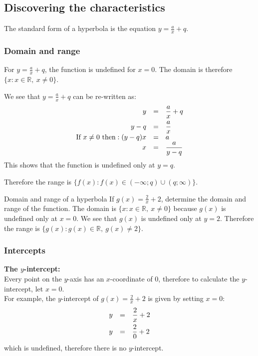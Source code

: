 \subsection*{Discovering the characteristics}  
The standard form of a hyperbola is the equation $y=\frac{a}{x}+q$.

\subsubsection*{Domain and range}

For $y=\frac{a}{x}+q$, the function is undefined for $x=0$. The domain is therefore $\{x:x\in \mathbb{R},~x\ne 0\}$.\par 
We see that $y=\frac{a}{x}+q$ can be re-written as:
\begin{equation*}
\begin{array}{ccl}\hfill y& =& \dfrac{a}{x}+q\hfill \vspace{4pt} \\
 \hfill y-q& =& \dfrac{a}{x}\hfill \\
 \hfill \mbox{If }x \ne  0 \mbox{ then}:(y-q)x& =& a\hfill \\
 \hfill x& =& \dfrac{a}{y-q}\hfill 
\end{array}
\end{equation*}
This shows that the function is undefined only at $y=q$.
\par
Therefore the range is $\{f(x):f(x)\in (-\infty ;q)\cup (q;\infty )\}$.\par 

\begin{wex}{Domain and range of a hyperbola}
{If $g(x)=\frac{2}{x}+2$, determine the domain and range of the function.}
{
The domain is $\{x:x\in \mathbb{R},~x\ne 0\}$ because $g(x)$ is undefined only at $x=0$.
We see that $g(x)$ is undefined only at $y=2$. Therefore the range is
$\{g(x): g(x) \in \mathbb{R},~g(x)\ne 2\}$.
}
\end{wex}


\subsubsection*{Intercepts}

\textbf{The $y$-intercept:} \\
Every point on the $y$-axis has an $x$-coordinate of $0$, therefore to calculate the $y$-intercept, let $x=0$.\\
For example, the $y$-intercept of $g(x)=\frac{2}{x}+2$ is given by setting $x=0$:
\begin{equation*}
\begin{array}{ccc}\hfill y& =& \dfrac{2}{x}+2\hfill \vspace{4pt}\\
 \hfill y& =& \dfrac{2}{0}+2\hfill 
\end{array}
\end{equation*}
which is undefined, therefore there is no $y$-intercept.\\
\\

